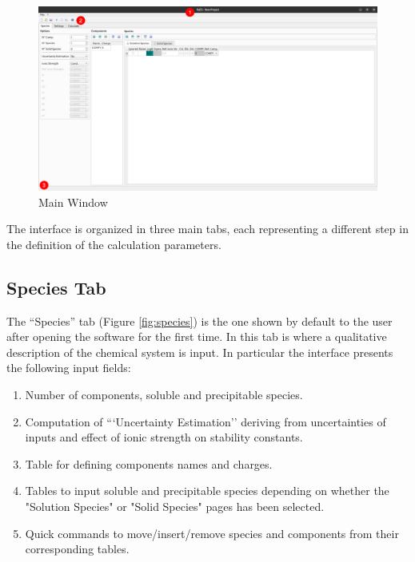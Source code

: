 \documentclass[a4paper, 12pt]{article}
\newcommand*\circled[1]{\kern-2.5em%
  \put(0,4){\color{red}\circle*{18}}\put(0,4){\circle{16}}%
  \put(-4,0){\color{white}\bfseries\large#1}~~}
\begin{document}
\begin{figure}[h]
	\centering
	\includegraphics[width=\textwidth]{img/main.png}
	\caption{Main Window}
    \label{fig:main}
\end{figure}

The interface is organized in three main tabs, each representing a different step in the definition of the calculation parameters.

\subsection{Species Tab}
The ``Species'' tab (Figure \ref*{fig:species}) is the one shown by default to the user after opening the software for the first time.
In this tab is where a qualitative description of the chemical system is input.
In particular the interface presents the following input fields:

\begin{enumerate}[label=\protect\circled{\arabic*}]
    \item Number of components, soluble and precipitable species.
    \item Computation of ```Uncertainty Estimation'' deriving from uncertainties of inputs and effect of ionic strength on stability constants.
    \item Table for defining components names and charges.
    \item Tables to input soluble and precipitable species depending on whether the "Solution Species" or "Solid Species" pages has been selected.
    \item Quick commands to move/insert/remove species and components from their corresponding tables.
\end{enumerate}
\end{document}
